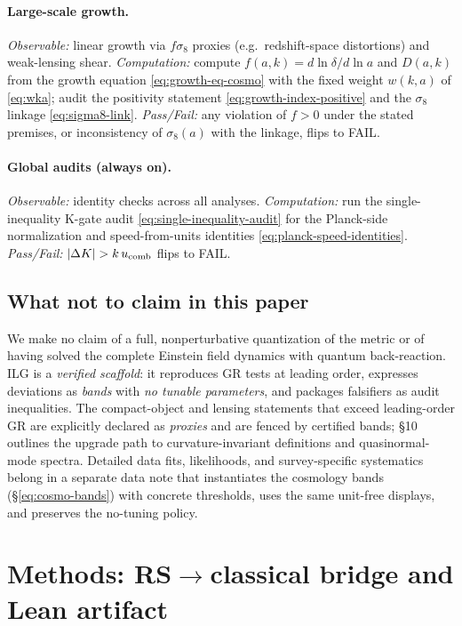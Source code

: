 \documentclass[12pt,a4paper]{article}
\begin{document}
\paragraph{Large-scale growth.}
\emph{Observable:} linear growth via \(f\sigma_8\) proxies (e.g.\ redshift-space distortions) and weak-lensing shear. 
\emph{Computation:} compute \(f(a,k)=d\ln\delta/d\ln a\) and \(D(a,k)\) from the growth equation \eqref{eq:growth-eq-cosmo} with the fixed weight \(w(k,a)\) of \eqref{eq:wka}; audit the positivity statement \eqref{eq:growth-index-positive} and the \(\sigma_8\) linkage \eqref{eq:sigma8-link}. 
\emph{Pass/Fail:} any violation of \(f>0\) under the stated premises, or inconsistency of \(\sigma_8(a)\) with the linkage, flips to \textsc{FAIL}.

\paragraph{Global audits (always on).}
\emph{Observable:} identity checks across all analyses. 
\emph{Computation:} run the single-inequality K-gate audit \eqref{eq:single-inequality-audit} for the Planck-side normalization and speed-from-units identities \eqref{eq:planck-speed-identities}.
\emph{Pass/Fail:} \(|\Delta K|>k\,u_{\rm comb}\) flips to \textsc{FAIL}.

\subsection{What not to claim in this paper}
We make no claim of a full, nonperturbative quantization of the metric or of having solved the complete Einstein field dynamics with quantum back-reaction. ILG is a \emph{verified scaffold}: it reproduces GR tests at leading order, expresses deviations as \emph{bands} with \emph{no tunable parameters}, and packages falsifiers as audit inequalities. The compact-object and lensing statements that exceed leading-order GR are explicitly declared as \emph{proxies} and are fenced by certified bands; §10 outlines the upgrade path to curvature-invariant definitions and quasinormal-mode spectra. Detailed data fits, likelihoods, and survey-specific systematics belong in a separate data note that instantiates the cosmology bands (\S\ref{eq:cosmo-bands}) with concrete thresholds, uses the same unit-free displays, and preserves the no-tuning policy.

\section{Methods: RS$\to$classical bridge and Lean artifact}
\label{sec:methods-bridge}
\end{document}
